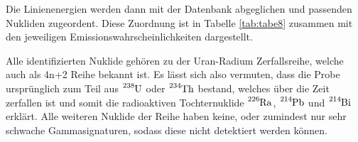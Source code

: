 
Die Linienenergien werden dann mit der Datenbank \cite{lara} abgeglichen und
passenden Nukliden zugeordent.
Diese Zuordnung ist in Tabelle \ref{tab:tabe8} zusammen mit den jeweiligen Emissionswahrscheinlichkeiten
dargestellt.

Alle identifizierten Nuklide gehören zu der Uran-Radium Zerfallsreihe, welche auch als 4n+2
Reihe bekannt ist. Es lässt sich also vermuten, dass die Probe ursprünglich zum Teil aus
$\ce{^{238}U}$ oder $\ce{^{234}Th}$ bestand, welches über  die Zeit zerfallen ist und somit die
radioaktiven Tochternuklide $\ce{^{226}Ra}$, $\ce{^{214}Pb}$ und $\ce{^{214}Bi}$ erklärt.
Alle weiteren Nuklide der Reihe haben keine, oder zumindest nur sehr schwache
Gammasignaturen, sodass diese nicht detektiert werden können.
